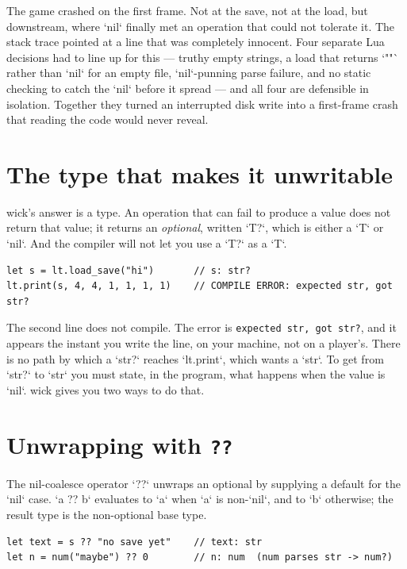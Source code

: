 \noindent
The game crashed on the first frame. Not at the save, not at the load, but
downstream, where `nil` finally met an operation that could not tolerate it.
The stack trace pointed at a line that was completely innocent. Four separate
Lua decisions had to line up for this --- truthy empty strings, a load that
returns `""` rather than `nil` for an empty file, `nil`-punning parse failure,
and no static checking to catch the `nil` before it spread --- and all four
are defensible in isolation. Together they turned an interrupted disk write
into a first-frame crash that reading the code would never reveal.

\section{The type that makes it unwritable}

wick's answer is a type. An operation that can fail to produce a value does
not return that value; it returns an \emph{optional}, written `T?`, which is
either a `T` or `nil`. And the compiler will not let you use a `T?` as a `T`.

\begin{lstlisting}[language=wick]
let s = lt.load_save("hi")       // s: str?
lt.print(s, 4, 4, 1, 1, 1, 1)    // COMPILE ERROR: expected str, got str?
\end{lstlisting}

\noindent
The second line does not compile. The error is \texttt{expected str, got
str?}, and it appears the instant you write the line, on your machine, not on
a player's. There is no path by which a `str?` reaches `lt.print`, which wants
a `str`. To get from `str?` to `str` you must state, in the program, what
happens when the value is `nil`. wick gives you two ways to do that.

\section{Unwrapping with \texttt{??}}

The nil-coalesce operator `??` unwraps an optional by supplying a default for
the `nil` case. `a ?? b` evaluates to `a` when `a` is non-`nil`, and to `b`
otherwise; the result type is the non-optional base type.

\begin{lstlisting}[language=wick]
let text = s ?? "no save yet"    // text: str
let n = num("maybe") ?? 0        // n: num  (num parses str -> num?)
\end{lstlisting}

